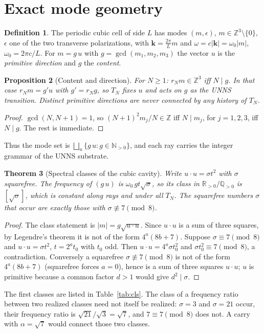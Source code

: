 \documentclass[11pt,a4paper]{article}
\newtheorem{theorem}{Theorem}[section]
\newtheorem{proposition}[theorem]{Proposition}
\theoremstyle{definition}
\newtheorem{definition}[theorem]{Definition}
\theoremstyle{remark}
\newcommand{\N}{\mathbb N}\newcommand{\Q}{\mathbb Q}\newcommand{\R}{\mathbb R}\newcommand{\Z}{\mathbb Z}
\begin{document}
\section{Exact mode geometry}
\begin{definition}
The periodic cubic cell of side $L$ has modes $(m,\epsilon)$, $m\in\Z^3\setminus\{0\}$, $\epsilon$ one of the two transverse polarizations, with $\mathbf k=\tfrac{2\pi}{L}m$ and $\omega=c|\mathbf k|=\omega_0|m|$, $\omega_0=2\pi c/L$. For $m=g\,u$ with $g=\gcd(m_1,m_2,m_3)$ the vector $u$ is the \emph{primitive direction} and $g$ the \emph{content}.
\end{definition}

\begin{proposition}[Content and direction]\label{prop:cd}
For $N\ge1$: $r_Nm\in\Z^3$ iff $N\mid g$. In that case $r_Nm=g'u$ with $g'=r_Ng$, so $T_N$ fixes $u$ and acts on $g$ as the UNNS transition. Distinct primitive directions are never connected by any history of $T_N$.
\end{proposition}
\begin{proof}
$\gcd(N,N+1)=1$, so $(N+1)^2m_j/N\in\Z$ iff $N\mid m_j$, for $j=1,2,3$, iff $N\mid g$. The rest is immediate.
\end{proof}
Thus the mode set is $\bigsqcup_u\{g\,u:g\in\N_{>0}\}$, and each ray carries the integer grammar of the UNNS substrate.

\begin{theorem}[Spectral classes of the cubic cavity]\label{thm:cls}
Write $u\cdot u=\sigma t^2$ with $\sigma$ squarefree. The frequency of $(g\,u)$ is $\omega_0\,gt\sqrt\sigma$, so its class in $\R_{>0}/\Q_{>0}$ is $[\sqrt\sigma]$, which is constant along rays and under all $T_N$. The squarefree numbers $\sigma$ that occur are exactly those with $\sigma\not\equiv7\pmod8$.
\end{theorem}
\begin{proof}
The class statement is $|m|=g\sqrt{u\cdot u}$. Since $u\cdot u$ is a sum of three squares, by Legendre's theorem it is not of the form $4^a(8b+7)$. Suppose $\sigma\equiv7\pmod 8$ and $u\cdot u=\sigma t^2$, $t=2^at_0$ with $t_0$ odd. Then $u\cdot u=4^a\sigma t_0^2$ and $\sigma t_0^2\equiv7\pmod8$, a contradiction. Conversely a squarefree $\sigma\not\equiv7\pmod8$ is not of the form $4^a(8b+7)$ (squarefree forces $a=0$), hence is a sum of three squares $u\cdot u$; $u$ is primitive because a common factor $d>1$ would give $d^2\mid\sigma$.
\end{proof}
The first classes are listed in Table~\ref{tab:cls}. The class of a frequency ratio between two realized classes need not itself be realized: $\sigma=3$ and $\sigma=21$ occur, their frequency ratio is $\sqrt{21}/\sqrt3=\sqrt7$, and $7\equiv7\pmod8$ does not. A carry with $\alpha=\sqrt7$ would connect those two classes.
\begin{table}[ht]\centering\small\caption{Squarefree $\sigma\le30$: realized as the class of some primitive $u\in\Z^3$ (smallest-norm example).}\label{tab:cls}\end{table}
\end{document}
